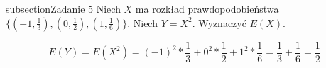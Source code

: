 subsection{Zadanie 5}
Niech $X$ ma rozkład prawdopodobieństwa $\{ (-1,\frac{1}{3}), (0,\frac{1}{2}), (1,\frac{1}{6})\}$. Niech $Y = X^2$. Wyznaczyć $E(X)$.

$$
E(Y) = E(X^2) = (-1)^2 * \frac{1}{3} + 0^2 * \frac{1}{2} + 1^2 * \frac{1}{6} = \frac{1}{3} + \frac{1}{6} = \frac{1}{2}
$$
